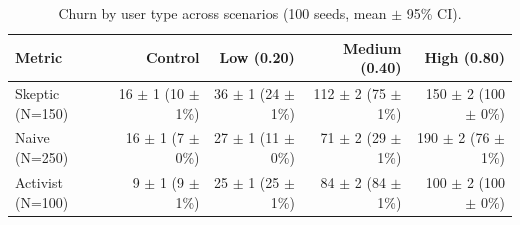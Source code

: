 \begin{table}[!t]
\centering
\caption{Churn by user type across scenarios (100 seeds, mean $\pm$ 95\% CI).}
\label{tab:churn_by_type}
\begin{tabular}{lrrrr}
\toprule
Metric & Control & Low (0.20) & Medium (0.40) & High (0.80) \\
\midrule
Skeptic (N=150) & 16 $\pm$ 1 (10 $\pm$ 1\%) & 36 $\pm$ 1 (24 $\pm$ 1\%) & 112 $\pm$ 2 (75 $\pm$ 1\%) & 150 $\pm$ 2 (100 $\pm$ 0\%) \\
Naive (N=250) & 16 $\pm$ 1 (7 $\pm$ 0\%) & 27 $\pm$ 1 (11 $\pm$ 0\%) & 71 $\pm$ 2 (29 $\pm$ 1\%) & 190 $\pm$ 2 (76 $\pm$ 1\%) \\
Activist (N=100) & 9 $\pm$ 1 (9 $\pm$ 1\%) & 25 $\pm$ 1 (25 $\pm$ 1\%) & 84 $\pm$ 2 (84 $\pm$ 1\%) & 100 $\pm$ 2 (100 $\pm$ 0\%) \\
\bottomrule
\end{tabular}
\end{table}
